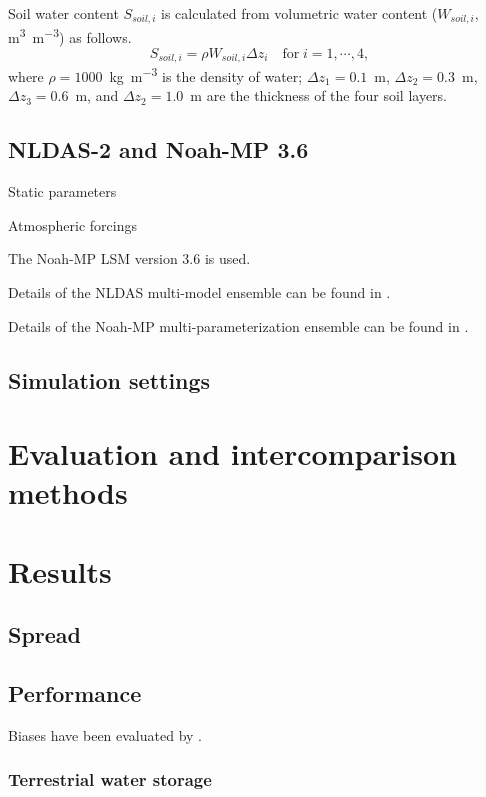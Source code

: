 \documentclass[essd]{copernicus}
\begin{document}
Soil water content $S_{soil,i}$ is calculated from volumetric water content
($W_{soil,i}$, \unit{m^3 m^{-3}}) as follows.
\begin{equation}
    S_{soil,i} = \rho W_{soil,i} \Delta z_i \quad \mathrm{for} \; i = 1, \cdots, 4 ,
\end{equation}
where $\rho=1000$~\unit{kg~m^{-3}} is the density of water; $\Delta z_1=0.1$~\unit{m}, $\Delta z_2=0.3$~\unit{m}, $\Delta z_3=0.6$~\unit{m}, and $\Delta z_2=1.0$~\unit{m} are the thickness of the four soil layers.

\subsection{NLDAS-2 and Noah-MP 3.6}

Static parameters

Atmospheric forcings

The Noah-MP LSM version 3.6 is used.

Details of the NLDAS multi-model ensemble can be found in \citet{xia2012JGRA,xia2012JGRAa,fei2021WRR}.

Details of the Noah-MP multi-parameterization ensemble can be found in \citet{zheng2019WRR,zheng2020JAMES,fei2021WRR}.


\subsection{Simulation settings}


\section{Evaluation and intercomparison methods} \label{sec:evaluation}


\section{Results} \label{sec:result}

\subsection{Spread}

\subsection{Performance}
Biases have been evaluated by \citet{zheng2020JAMES}.

\subsubsection{Terrestrial water storage}
\end{document}
